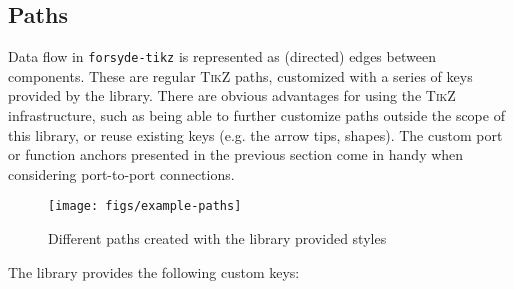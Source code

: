 \documentclass[10pt]{article}
\newcommand\bookmark[1]{\marginpar{\ttfamily #1}}
\begin{document}
\subsection{Paths}

Data flow in \texttt{forsyde-tikz} is represented as (directed) edges between components. These are regular \textsc{TikZ} paths, customized with a series of keys provided by the library. There are obvious advantages for using the \textsc{TikZ} infrastructure, such as being able to further customize paths outside the scope of this library, or reuse existing keys (e.g. the arrow tips, shapes). The custom port or function anchors presented in the previous section come in handy when considering port-to-port connections. 


\begin{figure}[htb]\centering
\texttt{[image: figs/example-paths]}

\caption{Different paths created with the library provided styles}
\end{figure}

The library provides the following custom keys:\bookmark{path keys}
\end{document}
